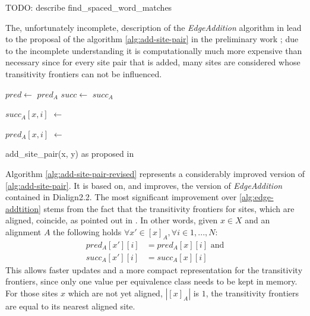 TODO: describe find\_spaced\_word\_matches

The, unfortunately incomplete, description of the \textit{EdgeAddition} algorithm in \cite{abdeddaim2000speeding} lead to the proposal of the algorithm \ref{alg:add-site-pair} in the preliminary work \cite{hundt2020praktkium}; due to the incomplete understanding it is computationally much more expensive than necessary since for every site pair that is added, many sites are considered whose transitivity frontiers can not be influenced.

\begin{algorithm}[h]
	\DontPrintSemicolon

	
	$pred \leftarrow$ $pred_A$\;
	$succ \leftarrow$ $succ_A$\;
	
	 {
		 {
			 {
				$succ_A[x, i]$ $\leftarrow$ 
			}
		}
	}
	
	 {
		 {
			 {
				$pred_A[x, i]$ $\leftarrow$ 
			}
		}
	}
	\caption{add\_site\_pair(x, y) as proposed in \cite{hundt2020praktkium}}
	\label{alg:add-site-pair}
\end{algorithm}

Algorithm \ref{alg:add-site-pair-revised} represents a considerably improved version of \ref{alg:add-site-pair}. It is based on, and improves, the version of \textit{EdgeAddition} contained in Dialign2.2. The most significant improvement over \ref{alg:edge-addtition} stems from the fact that the transitivity frontiers for sites, which are aligned, coincide, as pointed out in \cite{abdeddaim2000speeding}. In other words, given $x \in X$ and an alignment $A$ the following holds $\forall x' \in [x]_A, \forall i \in {1, ..., N}$:
\begin{align*}
 pred_A[x'][i] &= pred_A[x][i] \text{ and}\\
 succ_A[x'][i] &= succ_A[x][i]
\end{align*}
This allows faster updates and a more compact representation for the transitivity frontiers, since only one value per equivalence class needs to be kept in memory. For those sites $x$ which are not yet aligned, $|[x]_A|$ is $1$, the transitivity frontiers are equal to its nearest aligned site.

